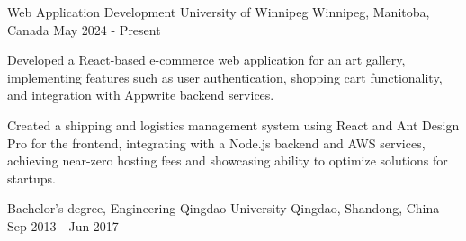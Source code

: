 

\begin{cventries}

  \cventry
  {Web Application Development} %
  {University of Winnipeg} %
  {Winnipeg, Manitoba, Canada} %
  {May 2024 - Present} %
  {
    \begin{cvitems} %
      \item {Developed a React-based e-commerce web application for an art gallery, implementing features such as user authentication, shopping cart functionality, and integration with Appwrite backend services.}
      \item {Created a shipping and logistics management system using React and Ant Design Pro for the frontend, integrating with a Node.js backend and AWS services, achieving near-zero hosting fees and showcasing ability to optimize solutions for startups.}
    \end{cvitems}
  }

  \vspace{5mm}

  \cventry
  {Bachelor's degree, Engineering} %
  {Qingdao University} %
  {Qingdao, Shandong, China} %
  {Sep 2013 - Jun 2017} %
  {
  }

  \vspace{-6mm}

\end{cventries}
